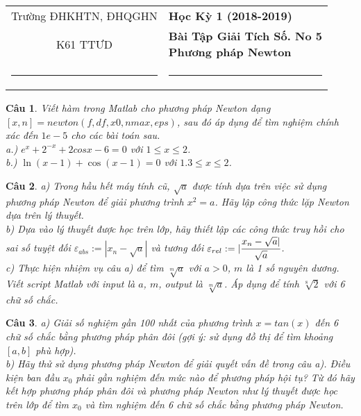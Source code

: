 \documentclass[11pt]{article}
\newtheorem{bt}{Câu}
\begin{document}
\begin{tabular*}
{\linewidth}{c>{\centering\hspace{0pt}} p{}}
Trường ĐHKHTN, ĐHQGHN & {\bf Học Kỳ 1 (2018-2019)}
\tabularnewline
K61 TTƯD & {\bf Bài Tập Giải Tích Số. No 5 \\ Phương pháp Newton}
\tabularnewline
\rule{1in}{1pt}  \small  & \rule{2in}{1pt} %
\tabularnewline

\end{tabular*}
%

\begin{bt} %
Viết hàm trong Matlab cho phương pháp Newton dạng $[x,n] = newton(f,df,x0,nmax,eps)$, sau đó áp dụng để tìm nghiệm chính xác đến $1e-5$ cho các bài toán sau.\\
a.) $e^x + 2^{-x} + 2 cos x - 6 = 0$ với $1 \leq x \leq 2$. \\
b.) $\ln(x - 1) + \cos(x - 1) = 0$ với $1.3 \leq x \leq 2$.
\end{bt}

\begin{bt} %
a) Trong hầu hết máy tính cũ, $\sqrt{a}$ được tính dựa trên việc sử dụng phương pháp Newton để giải phương trình $x^2=a$. Hãy lập công thức lặp Newton dựa trên lý thuyết.  \\
b) Dựa vào lý thuyết được học trên lớp, hãy thiết lập các công thức truy hồi cho sai số tuyệt đối $\varepsilon_{abs}:=|x_n-\sqrt{a}|$ và tương đối $\varepsilon_{rel}:=|\cfrac{x_n-\sqrt{a}|}{\sqrt{a}}$.\\
c) Thực hiện nhiệm vụ câu a) để tìm $\sqrt[m]{a}$ với $a>0$, $m$ là 1 số nguyên dương. Viết script Matlab với input là $a$, $m$, output là $\sqrt[m]{a}$. Áp dụng để tính $\sqrt[8]{2}$ với 6 chữ số chắc.
\end{bt}

\begin{bt} %
a) Giải số nghiệm gần 100 nhất của phương trình $x=tan(x)$ đến 6 chữ số chắc bằng phương pháp phân đôi (gợi ý: sử dụng đồ thị để tìm khoảng $[a,b]$ phù hợp). \\
b) Hãy thử sử dụng phương pháp Newton để giải quyết vấn đề trong câu a). Điều kiện ban đầu $x_0$ phải gần nghiệm đến mức nào để phương pháp hội tụ? Từ đó hãy kết hợp phương pháp phân đôi và phương pháp Newton như lý thuyết được học trên lớp để tìm $x_0$ và tìm nghiệm đến 6 chữ số chắc bằng phương pháp Newton.
\end{bt}
\end{document}
